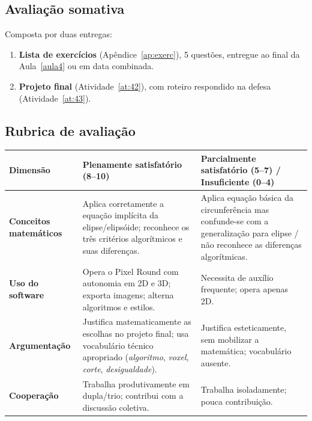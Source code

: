 \documentclass[12pt,a4paper]{scrartcl}
\begin{document}
\subsection{Avaliação somativa}
Composta por duas entregas:

\begin{enumerate}[leftmargin=1.5em,itemsep=0.2em,topsep=0.3em,nosep]
  \item \textbf{Lista de exercícios} (Apêndice~\ref{ap:exerc}), 5 questões, entregue ao final da Aula~\ref{aula4} ou em data combinada.
  \item \textbf{Projeto final} (Atividade~\ref{at:42}), com roteiro respondido na defesa (Atividade~\ref{at:43}).
\end{enumerate}

\subsection{Rubrica de avaliação}

\begin{center}
\small
\begin{tabularx}{\textwidth}{@{}p{}XX@{}}
\toprule
\textbf{Dimensão} & \textbf{Plenamente satisfatório (8--10)} & \textbf{Parcialmente satisfatório (5--7) / Insuficiente (0--4)} \\
\midrule
\textbf{Conceitos matemáticos} & Aplica corretamente a equação implícita da elipse/elipsóide; reconhece os três critérios algorítmicos e suas diferenças. & Aplica equação básica da circunferência mas confunde-se com a generalização para elipse / não reconhece as diferenças algorítmicas. \\
\addlinespace[3pt]
\textbf{Uso do software} & Opera o Pixel Round com autonomia em 2D e 3D; exporta imagens; alterna algoritmos e estilos. & Necessita de auxílio frequente; opera apenas 2D. \\
\addlinespace[3pt]
\textbf{Argumentação} & Justifica matematicamente as escolhas no projeto final; usa vocabulário técnico apropriado (\emph{algoritmo}, \emph{voxel}, \emph{corte}, \emph{desigualdade}). & Justifica esteticamente, sem mobilizar a matemática; vocabulário ausente. \\
\addlinespace[3pt]
\textbf{Cooperação} & Trabalha produtivamente em dupla/trio; contribui com a discussão coletiva. & Trabalha isoladamente; pouca contribuição. \\
\bottomrule
\end{tabularx}
\end{center}
\end{document}
